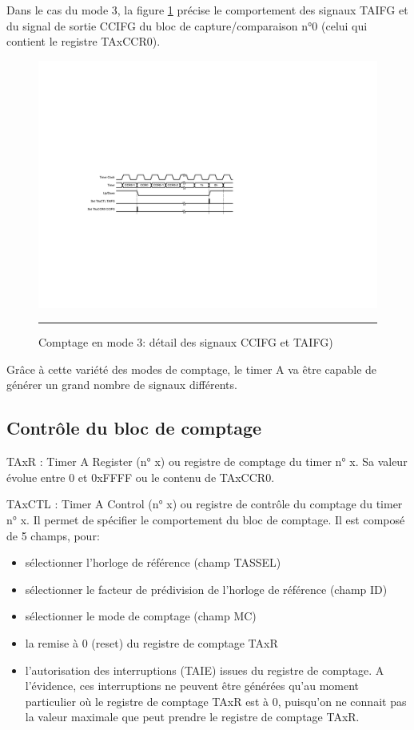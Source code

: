 Dans le cas du mode 3, la figure  \ref{fig:TimerAmode3b} précise le comportement des signaux TAIFG et du signal de sortie CCIFG du bloc de capture/comparaison n°0 (celui qui contient le registre TAxCCR0).
\begin{figure} [H]
  \centering
  \includegraphics[angle=0, width=12cm]{./Figures/Chap5_Timer/Timer_Mode_3b.pdf}
  \rule{35em}{0.5pt}
  \caption[TimerA Mode 3]{Comptage en mode 3: détail des signaux CCIFG et TAIFG)}
  \label{fig:TimerAmode3b}
\end{figure}

Grâce à cette variété des modes de comptage, le timer A va être capable de générer un grand nombre de signaux différents.

\subsection{Contrôle du bloc de comptage}
TAxR : Timer A Register (n° x) ou registre de comptage du timer n° x. Sa valeur évolue entre 0 et 0xFFFF ou le contenu de TAxCCR0.

TAxCTL : Timer A Control (n° x) ou registre de contrôle du comptage du timer n° x. Il permet de spécifier le comportement du bloc de comptage.
Il est composé de 5 champs, pour:
\begin{itemize}[label=\textbullet,font=\small]
\item sélectionner l'horloge de référence (champ TASSEL)
\item sélectionner le facteur de prédivision de l'horloge de référence (champ ID)
\item sélectionner le mode de comptage (champ MC)
\item la remise à 0 (reset) du registre de comptage TAxR
\item l'autorisation des interruptions (TAIE) issues du registre de comptage. A l'évidence, ces interruptions ne peuvent être générées qu'au moment particulier où le registre de comptage TAxR est à 0, puisqu'on ne connait pas la valeur maximale que peut prendre le registre de comptage TAxR.
\end{itemize}

